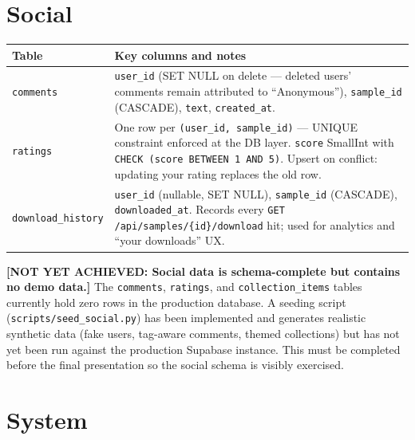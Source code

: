 \documentclass[12pt,letterpaper]{report}
\begin{document}
\section{Social}

\begin{center}
\begin{tabularx}{\textwidth}{lX}
\toprule
\textbf{Table} & \textbf{Key columns and notes} \\
\midrule
\texttt{comments}
  & \texttt{user\_id} (SET NULL on delete --- deleted users' comments remain
    attributed to ``Anonymous''), \texttt{sample\_id} (CASCADE),
    \texttt{text}, \texttt{created\_at}. \\
\addlinespace
\texttt{ratings}
  & One row per \texttt{(user\_id, sample\_id)} --- UNIQUE constraint enforced
    at the DB layer. \texttt{score} SmallInt with \texttt{CHECK (score BETWEEN
    1 AND 5)}. Upsert on conflict: updating your rating replaces the old row. \\
\addlinespace
\texttt{download\_history}
  & \texttt{user\_id} (nullable, SET NULL), \texttt{sample\_id} (CASCADE),
    \texttt{downloaded\_at}. Records every \texttt{GET /api/samples/\{id\}/download}
    hit; used for analytics and ``your downloads'' UX. \\
\bottomrule
\end{tabularx}
\end{center}

\begin{warningbox}
  \textbf{[NOT YET ACHIEVED: Social data is schema-complete but contains no demo data.]}
  The \texttt{comments}, \texttt{ratings}, and \texttt{collection\_items} tables
  currently hold zero rows in the production database. A seeding script
  (\texttt{scripts/seed\_social.py}) has been implemented and generates realistic
  synthetic data (fake users, tag-aware comments, themed collections) but has not
  yet been run against the production Supabase instance. This must be completed
  before the final presentation so the social schema is visibly exercised.
\end{warningbox}

\section{System}
\end{document}
